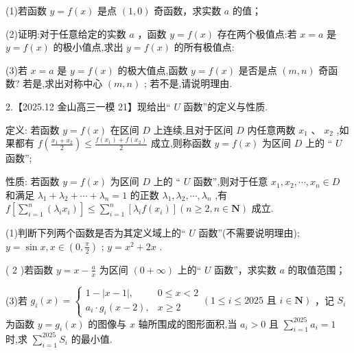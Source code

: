 \documentclass[10pt]{article}
\newcommand*\circled[1]{\tikz[baseline=(char.base)]{\node[shape=circle,draw,inner sep=1.5pt] (char) {\small #1};}}
\begin{document}
(1)若函数 \(y = f\left( x\right)\) 是点 \(\left( {1,0}\right)\) 奇函数，求实数 \(a\) 的值；

(2)证明:对于任意给定的实数 \(a\) ，函数 \(y = f\left( x\right)\) 存在两个极值点:若 \(x = a\) 是 \(y = f\left( x\right)\) 的极小值点,求出 \(y = f\left( x\right)\) 的所有极值点:

(3)若 \(x = a\) 是 \(y = f\left( x\right)\) 的极大值点,函数 \(y = f\left( x\right)\) 是否是点 \(\left( {m,n}\right)\) 奇函数? 若是,求出对称中心 \(\left( {m,n}\right)\) ; 若不是,请说明理由.

2.【2025.12 金山高三一模 21】现给出“ \(U\) 函数”的定义与性质.

定义: 若函数 \(y = f\left( x\right)\) 在区间 \(D\) 上连续,且对于区间 \(D\) 内任意两数 \({x}_{1}\text{ 、 }{x}_{2}\) ,如果都有 \(f\left( \frac{{x}_{1} + {x}_{2}}{2}\right)  \leq  \frac{f\left( {x}_{1}\right)  + f\left( {x}_{2}\right) }{2}\) 成立,则称函数 \(y = f\left( x\right)\) 为区间 \(D\) 上的 “ \(U\) 函数”;

性质: 若函数 \(y = f\left( x\right)\) 为区间 \(D\) 上的 “ \(U\) 函数”,则对于任意 \({x}_{1},{x}_{2},\cdots ,{x}_{n} \in  D\) 和满足 \({\lambda }_{1} + {\lambda }_{2} + \cdots  + {\lambda }_{n} = 1\) 的正数 \({\lambda }_{1},{\lambda }_{2},\cdots ,{\lambda }_{n}\) ,有 \(f\left\lbrack  {\mathop{\sum }\limits_{{i = 1}}^{n}\left( {{\lambda }_{i}{x}_{i}}\right) }\right\rbrack   \leq  \mathop{\sum }\limits_{{i = 1}}^{n}\left\lbrack  {{\lambda }_{i}f\left( {x}_{i}\right) }\right\rbrack  \left( {n \geq  2,n \in  \mathbf{N}}\right)\) 成立.

(1)判断下列两个函数是否为其定义域上的“ \(U\) 函数”(不需要说明理由);  \circled{1}  \(y = \sin x,x \in  \left( {0,\frac{\pi }{2}}\right)\) ;  \circled{2}  \(y = {x}^{2} + {2x}\) .

( 2 )若函数 \(y = x - \frac{a}{x}\) 为区间 \(\left( {0 + \infty }\right)\) 上的“ \(U\) 函数”，求实数 \(a\) 的取值范围；

(3)若 \({g}_{i}\left( x\right)  = \left\{  {\begin{matrix} 1 - \left| {x - 1}\right| , & 0 \leq  x < 2 \\  {a}_{i} \cdot  {g}_{i}\left( {x - 2}\right) , & x \geq  2 \end{matrix}\left( {1 \leq  i \leq  {2025}\text{ 且 }i \in  \mathbf{N}}\right) }\right.\) ，记 \({S}_{i}\) 为函数 \(y = {g}_{i}\left( x\right)\) 的图像与 \(x\) 轴所围成的图形面积,当 \({a}_{i} > 0\) 且 \(\mathop{\sum }\limits_{{i = 1}}^{{2025}}{a}_{i} = 1\) 时,求 \(\mathop{\sum }\limits_{{i = 1}}^{{2025}}{S}_{i}\) 的最小值.
\end{document}

